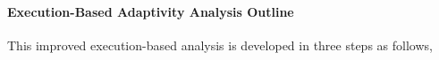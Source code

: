 \paragraph*{Execution-Based Adaptivity Analysis Outline}
This improved execution-based analysis is developed
 in three steps as follows,
